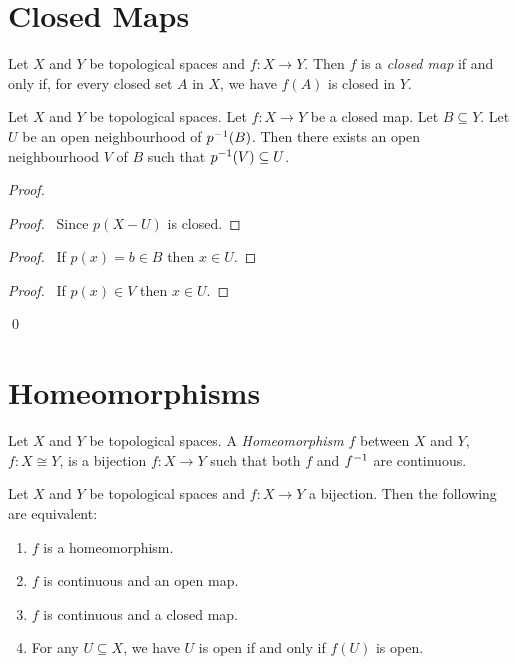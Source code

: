 \section{Closed Maps}

\begin{definition}
    Let $X$ and $Y$ be topological spaces and $f : X \rightarrow Y$.
    Then $f$ is a \emph{closed map} if and only if, for every closed set
    $A$ in $X$, we have $f(A)$ is closed in $Y$.
\end{definition}

\begin{lemma}
    \label{lemma:closed_map_neighbourhoods}
    Let $X$ and $Y$ be topological spaces. Let $f : X \rightarrow Y$
    be a closed map. Let $B \subseteq Y$. Let $U$ be an open
    neighbourhood of ${p}^{-1}(B)$. Then there exists an open neighbourhood
    $V$ of $B$ such that ${p}^{-1}(V) \subseteq U$.
\end{lemma}

\begin{proof}
    \pf
    \begin{proof}
        \pf\ Since $p(X - U)$ is closed.
    \end{proof}
    \begin{proof}
        \pf\ If $p(x) = b \in B$ then $x \in U$.
    \end{proof}
    \begin{proof}
        \pf\ If $p(x) \in V$ then $x \in U$.
    \end{proof}
    \qed
\end{proof}

\section{Homeomorphisms}

\begin{definition}[Homeomorphism]
    Let $X$ and $Y$ be topological spaces. A \emph{Homeomorphism} $f$ between $X$ and $Y$, $f : X \cong Y$,
    is a bijection $f : X \rightarrow Y$ such that both $f$ and ${f}^{-1}$ are continuous.
\end{definition}

\begin{lemma}
    \label{lemma:homeomorphism}
    Let $X$ and $Y$ be topological spaces and $f : X \rightarrow Y$ a bijection. Then the following are
    equivalent:
    \begin{enumerate}
        \item $f$ is a homeomorphism.
        \item $f$ is continuous and an open map.
        \item $f$ is continuous and a closed map.
        \item For any $U \subseteq X$, we have $U$ is open if and only if $f(U)$ is open.
    \end{enumerate}
\end{lemma}

